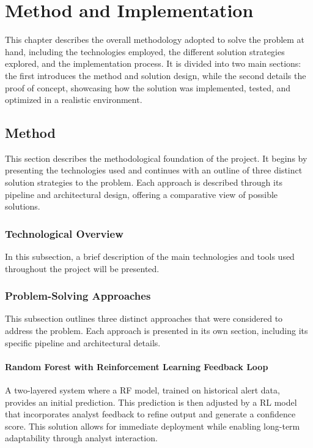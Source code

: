 \chapter{Method and Implementation}
\label{chap:Chapter3}

This chapter describes the overall methodology adopted to solve the problem at hand, including the technologies employed, the different solution strategies explored, and the implementation process. 
It is divided into two main sections: the first introduces the method and solution design, while the second details the proof of concept, showcasing how the solution was implemented, tested, and optimized in a realistic environment.

\section{Method}
This section describes the methodological foundation of the project. 
It begins by presenting the technologies used and continues with an outline of three distinct solution strategies to the problem. 
Each approach is described through its pipeline and architectural design, offering a comparative view of possible solutions.

\subsection{Technological Overview}
In this subsection, a brief description of the main technologies and tools used throughout the project will be presented.

\subsection{Problem-Solving Approaches}
This subsection outlines three distinct approaches that were considered to address the problem. 
Each approach is presented in its own section, including its specific pipeline and architectural details.

\subsubsection{Random Forest with Reinforcement Learning Feedback Loop}
A two-layered system where a \gls{RF} model, trained on historical alert data, provides an initial prediction. 
This prediction is then adjusted by a \gls{RL} model that incorporates analyst feedback to refine output and generate a confidence score. 
This solution allows for immediate deployment while enabling long-term adaptability through analyst interaction.


